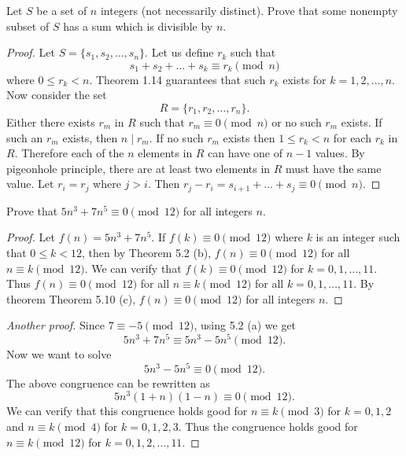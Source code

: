 

\begin{exercise}{1}{}
  Let \( S \) be a set of \( n \) integers (not necessarily distinct).
  Prove that some nonempty subset of \( S \) has a sum which is
  divisible by \( n \).
\end{exercise}

\begin{proof}
  Let \( S = \{ s_1, s_2, \dots, s_n \} \). Let us define \( r_k \)
  such that
  \[
  s_1 + s_2 + \dots + s_k \equiv r_k \pmod{n}
  \]
  where \( 0 \le r_k < n \). Theorem 1.14 guarantees that such \( r_k
  \) exists for \( k = 1, 2, \dots, n \). Now consider the set
  \[
  R = \{ r_1, r_2, \dots, r_n \}.
  \]
  Either there exists \( r_m \) in \( R \) such that \( r_m \equiv 0
  \pmod{n} \) or no such \( r_m \) exists. If such an \( r_m \)
  exists, then \( n \mid r_m \). If no such \( r_m \) exists then \( 1
  \le r_k < n \) for each \( r_k \) in \( R \). Therefore each of the
  \( n \) elements in \( R \) can have one of \( n - 1 \) values. By
  pigeonhole principle, there are at least two elements in \( R \)
  must have the same value. Let \( r_i = r_j \) where \( j > i \).
  Then \( r_j - r_i = s_{i + 1} + \dots + s_{j} \equiv 0
  \pmod{n} \).
\end{proof}


\begin{exercise}{2}{}
  Prove that \( 5n^3 + 7n^5 \equiv 0 \pmod{12} \) for all integers \( n \).
\end{exercise}

\begin{proof}
  Let \( f(n) = 5n^3 + 7n^5 \). If \( f(k) \equiv 0 \pmod{12} \) where
  \( k \) is an integer such that \( 0 \le k < 12 \), then by Theorem
  5.2 (b), \( f(n) \equiv 0 \pmod{12} \) for all \( n \equiv k
  \pmod{12} \). We can verify that \( f(k) \equiv 0 \pmod{12} \) for
  \( k = 0, 1, \dots, 11 \). Thus \( f(n) \equiv 0 \pmod{12} \) for
  all \( n \equiv k \pmod{12} \) for all \( k = 0, 1, \dots, 11 \). By
  theorem Theorem 5.10 (c), \( f(n) \equiv 0 \pmod{12} \) for all
  integers \( n \).
\end{proof}

\begin{proof}[Another proof]
  Since \( 7 \equiv -5 \pmod{12} \), using 5.2 (a) we get
  \[ 5n^3 + 7n^5 \equiv 5n^3 - 5n^5 \pmod{12}. \]
  Now we want to solve
  \[ 5n^3 - 5n^5 \equiv 0 \pmod{12}. \]
  The above congruence can be rewritten as
  \[ 5n^3 (1 + n) (1 - n) \equiv 0 \pmod{12}. \]
  We can verify that this congruence holds good for \( n \equiv k
  \pmod{3} \) for \( k = 0, 1, 2 \) and \( n \equiv k \pmod{4} \) for
  \( k = 0, 1, 2, 3 \). Thus the congruence holds good for \( n \equiv
  k \pmod{12} \) for \( k = 0, 1, 2, \dots, 11 \).
\end{proof}


